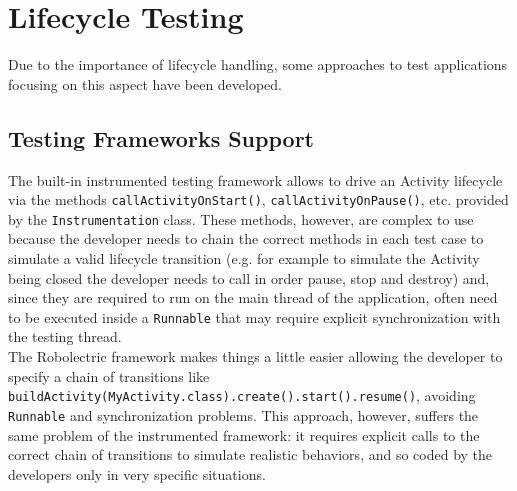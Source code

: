 \documentclass[11pt,a4paper,notitlepage]{article}
\begin{document}
\section{Lifecycle Testing}
Due to the importance of lifecycle handling, some approaches to test applications focusing on this aspect have been developed.

\subsection{Testing Frameworks Support}
The built-in instrumented testing framework allows to drive an Activity lifecycle via the methods \texttt{callActivityOnStart()}, \texttt{callActivityOnPause()}, etc. provided by the \texttt{Instrumentation} class. These methods, however, are complex to use because the developer needs to chain the correct methods in each test case to simulate a valid lifecycle transition (e.g. for example to simulate the Activity being closed the developer needs to call in order pause, stop and destroy) and, since they are required to run on the main thread of the application, often need to be executed inside a \texttt{Runnable} that may require explicit synchronization with the testing thread.\bigskip \\
The Robolectric framework makes things a little easier allowing the developer to specify a chain of transitions like \texttt{buildActivity(MyActivity.class).create().start().resume()}, avoiding \texttt{Runnable} and synchronization problems. This approach, however, suffers the same problem of the instrumented framework: it requires explicit calls to the correct chain of transitions to simulate realistic behaviors, and so coded by the developers only in very specific situations.
\end{document}
